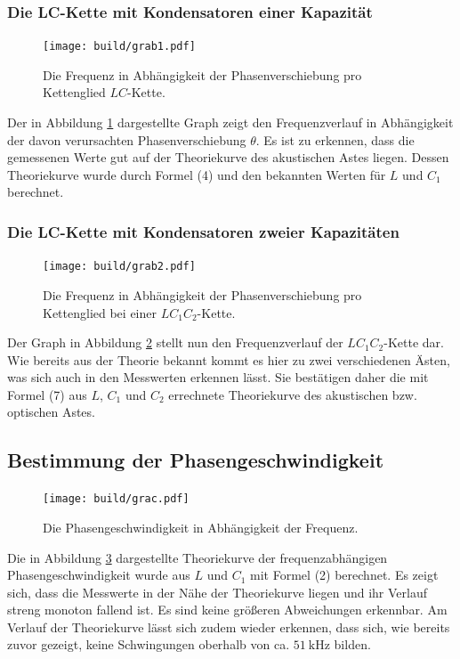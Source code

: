 \subsubsection{Die LC-Kette mit Kondensatoren einer Kapazität}
\begin{figure}[H]
	\centering
	\caption{Die Frequenz in Abhängigkeit der Phasenverschiebung pro Kettenglied $LC$-Kette.}
	\texttt{[image: build/grab1.pdf]}
	\label{fig:grab1}
\end{figure}

Der in Abbildung \ref{fig:grab1} dargestellte Graph zeigt den Frequenzverlauf in Abhängigkeit der davon verursachten Phasenverschiebung $\theta$.
Es ist zu erkennen, dass die gemessenen Werte gut auf der Theoriekurve des akustischen Astes liegen.
 Dessen Theoriekurve wurde durch Formel (4) und den bekannten Werten für $L$ und $C_1$ berechnet.


\subsubsection{Die LC-Kette mit Kondensatoren zweier Kapazitäten}
\begin{figure}[H]
	\centering
	\caption{Die Frequenz in Abhängigkeit der Phasenverschiebung pro Kettenglied bei einer $LC_1C_2$-Kette.}
	\texttt{[image: build/grab2.pdf]}
	\label{fig:grab2}
\end{figure}

Der  Graph in Abbildung \ref{fig:grab2} stellt nun den Frequenzverlauf der $LC_1C_2$-Kette dar.
 Wie bereits aus der Theorie bekannt kommt es hier zu zwei verschiedenen Ästen, was sich auch in den Messwerten erkennen lässt.
Sie bestätigen daher die mit Formel (7) aus $L$, $C_1$ und $C_2$ errechnete Theoriekurve des akustischen bzw. optischen Astes.

\subsection{Bestimmung der Phasengeschwindigkeit}

\begin{figure}[H]
	\centering
	\caption{Die Phasengeschwindigkeit in Abhängigkeit der Frequenz.}
	\texttt{[image: build/grac.pdf]}
	\label{fig:grac}
\end{figure}

Die in Abbildung \ref{fig:grac} dargestellte Theoriekurve der frequenzabhängigen Phasengeschwindigkeit wurde aus $L$ und $C_1$ mit Formel (2) berechnet.
Es zeigt sich, dass die Messwerte in der Nähe der Theoriekurve liegen und ihr Verlauf
 streng monoton fallend ist. Es sind keine größeren Abweichungen erkennbar. Am
  Verlauf der Theoriekurve lässt sich zudem wieder erkennen, dass sich, wie bereits zuvor
 gezeigt, keine Schwingungen oberhalb von ca. $\SI{51}{\kilo\hertz}$ bilden.

